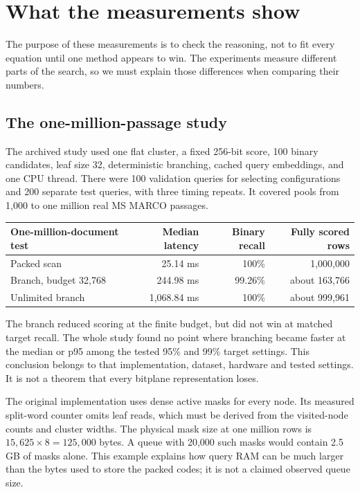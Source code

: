 \section{What the measurements show}
\label{sec:evidence}
The purpose of these measurements is to check the reasoning, not to fit every equation until
one method appears to win. The experiments measure different parts of the search, so we must explain those differences
when comparing their numbers.

\subsection{The one-million-passage study}
The archived study used one flat cluster, a fixed 256-bit score, 100 binary candidates,
leaf size 32, deterministic branching, cached query embeddings, and one CPU thread.
There were 100 validation queries for selecting configurations and 200 separate test queries,
with three timing repeats. It covered pools from 1,000 to one million real MS MARCO passages.

\begin{center}
\begin{tabular}{@{}lrrr@{}}\toprule
One-million-document test & Median latency & Binary recall & Fully scored rows\\\midrule
Packed scan & 25.14 ms & 100\% & 1,000,000\\
Branch, budget 32,768 & 244.98 ms & 99.26\% & about 163,766\\
Unlimited branch & 1,068.84 ms & 100\% & about 999,961\\\bottomrule
\end{tabular}
\end{center}
The branch reduced scoring at the finite budget, but did not win at matched target recall.
The whole study found no point where branching became faster at the median or p95 among the tested 95\% and 99\% target settings.
This conclusion belongs to that implementation, dataset, hardware and tested settings. It is not a theorem
that every bitplane representation loses.

The original implementation uses dense active masks for every node. Its measured split-word
counter omits leaf reads, which must be derived from the visited-node counts and cluster widths.
The physical mask size at one million rows is $15{,}625\times8=125{,}000$ bytes. A queue with
20,000 such masks would contain 2.5 GB of masks alone. This example explains how query RAM can
be much larger than the bytes used to store the packed codes; it is not a claimed observed queue size.

